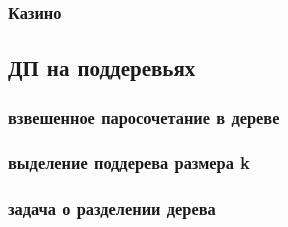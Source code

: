 \documentclass[a4paper,12pt]{article}
\begin{document}
      \subsubsection{Казино}

    \subsection{ДП на поддеревьях}

      \subsubsection{взвешенное паросочетание в дереве}

      \subsubsection{выделение поддерева размера k}

      \subsubsection{задача о разделении дерева}
\end{document}
